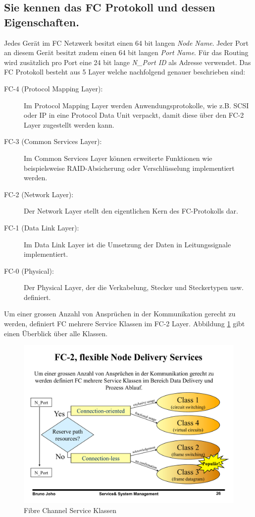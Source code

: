 \subsection{Sie kennen das FC Protokoll und dessen Eigenschaften.}

Jedes Gerät im FC Netzwerk besitzt einen 64 bit langen \emph{Node Name}. Jeder Port an diesem Gerät besitzt zudem einen 64 bit langen \emph{Port Name}. Für das Routing wird zusätzlich pro Port eine 24 bit lange \emph{N\_Port ID} als Adresse verwendet.
Das FC Protokoll besteht aus 5 Layer welche nachfolgend genauer beschrieben sind:
\begin{description}
	\item[FC-4 (Protocol Mapping Layer):] Im Protocol Mapping Layer werden Anwendungsprotokolle, wie z.B. SCSI oder IP in eine Protocol Data Unit verpackt, damit diese über den FC-2 Layer zugestellt werden kann.
	\item[FC-3 (Common Services Layer):] Im Common Services Layer können erweiterte Funktionen wie beispielsweise RAID-Absicherung oder Verschlüsselung implementiert werden.
	\item[FC-2 (Network Layer):] Der Network Layer stellt den eigentlichen Kern des FC-Protokolls dar.
	\item[FC-1 (Data Link Layer):] Im Data Link Layer ist die Umsetzung der Daten in Leitungssignale implementiert.
	\item[FC-0 (Physical):] Der Physical Layer, der die Verkabelung, Stecker und Steckertypen usw. definiert.
\end{description}
Um einer grossen Anzahl von Ansprüchen in der Kommunikation gerecht zu werden, definiert FC mehrere Service Klassen im FC-2 Layer. Abbildung \ref{fig:fc-service-classes} gibt einen Überblick über alle Klassen. 

\begin{figure}[h!]
\centering
\includegraphics[width=0.5\linewidth]{fig/fc-service-classes}
\caption{Fibre Channel Service Klassen}
\label{fig:fc-service-classes}
\end{figure}

